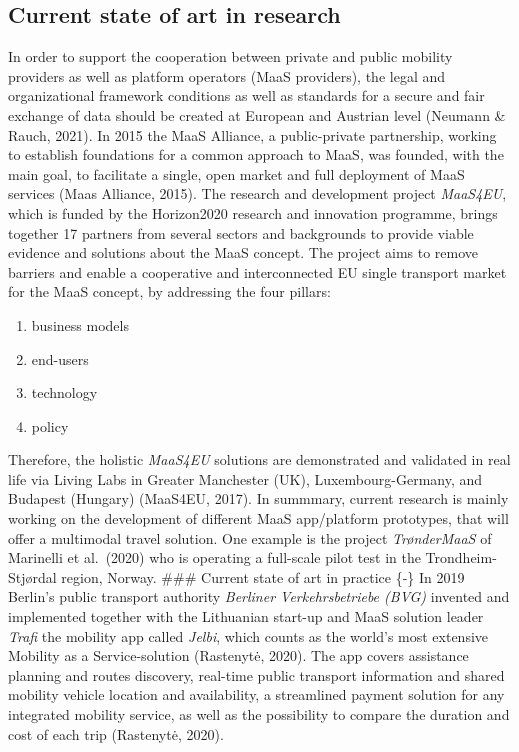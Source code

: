 \documentclass[
]{book}
\providecommand{\tightlist}{%
  \setlength{\itemsep}{0pt}\setlength{\parskip}{0pt}}
\begin{document}
\hypertarget{current-state-of-art-in-research-10}{%
\subsection*{Current state of art in research}\label{current-state-of-art-in-research-10}}

In order to support the cooperation between private and public mobility providers as well as platform operators (MaaS providers), the legal and organizational framework conditions as well as standards for a secure and fair exchange of data should be created at European and Austrian level (Neumann \& Rauch, 2021).
In 2015 the MaaS Alliance, a public-private partnership, working to establish foundations for a common approach to MaaS, was founded, with the main goal, to facilitate a single, open market and full deployment of MaaS services (Maas Alliance, 2015).
The research and development project \emph{MaaS4EU}, which is funded by the Horizon2020 research and innovation programme, brings together 17 partners from several sectors and backgrounds to provide viable evidence and solutions about the MaaS concept. The project aims to remove barriers and enable a cooperative and interconnected EU single transport market for the MaaS concept, by addressing the four pillars:

\begin{enumerate}
\def\labelenumi{(\arabic{enumi})}
\tightlist
\item
  business models
\item
  end-users
\item
  technology
\item
  policy
\end{enumerate}

Therefore, the holistic \emph{MaaS4EU} solutions are demonstrated and validated in real life via Living Labs in Greater Manchester (UK), Luxembourg-Germany, and Budapest (Hungary) (MaaS4EU, 2017). In summmary, current research is mainly working on the development of different MaaS app/platform prototypes, that will offer a multimodal travel solution. One example is the project \emph{TrønderMaaS} of Marinelli et al.~(2020) who is operating a full-scale pilot test in the Trondheim-Stjørdal region, Norway.
\#\#\# Current state of art in practice \{-\}
In 2019 Berlin's public transport authority \emph{Berliner Verkehrsbetriebe (BVG)} invented and implemented together with the Lithuanian start-up and MaaS solution leader \emph{Trafi} the mobility app called \emph{Jelbi}, which counts as the world's most extensive Mobility as a Service-solution (Rastenytė, 2020). The app covers assistance planning and routes discovery, real-time public transport information and shared mobility vehicle location and availability, a streamlined payment solution for any integrated mobility service, as well as the possibility to compare the duration and cost of each trip (Rastenytė, 2020).
\end{document}
